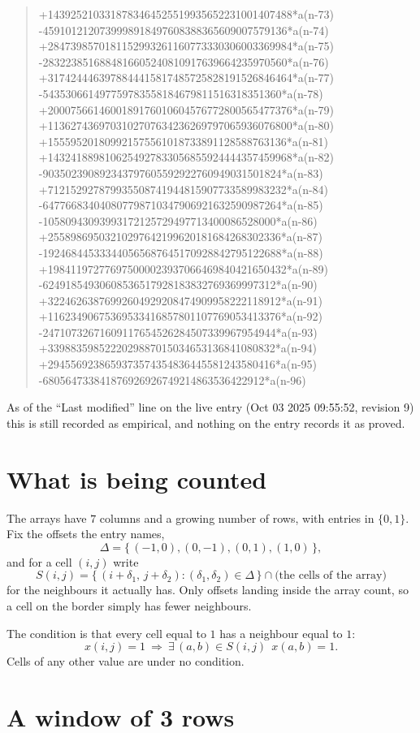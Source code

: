 \documentclass[11pt,a4paper]{article}
\theoremstyle{plain}
\theoremstyle{definition}
\begin{document}
\begin{quote}
+1439252103318783464525519935652231001407488*a(n-73) -4591012120739998918497608388365609007579136*a(n-74) +2847398570181152993261160773330306003369984*a(n-75) -2832238516884816605240810917639664235970560*a(n-76) +3174244463978844415817485725828191526846464*a(n-77) -543530661497759783558184679811516318351360*a(n-78) +2000756614600189176010604576772800565477376*a(n-79) +1136274369703102707634236269797065936076800*a(n-80) +155595201809921575561018733891128588763136*a(n-81) +1432418898106254927833056855924444357459968*a(n-82) -903502390892343797605592922760949031501824*a(n-83) +712152927879935508741944815907733589983232*a(n-84) -647766834040807798710347906921632590987264*a(n-85) -10580943093993172125729497713400086528000*a(n-86) +25589869503210297642199620181684268302336*a(n-87) -192468445333440565687645170928842795122688*a(n-88) +198411972776975000023937066469840421650432*a(n-89) -62491854930608536517928183832769369997312*a(n-90) +32246263876992604929208474909958222118912*a(n-91) +11623490675369533416857801107769053413376*a(n-92) -24710732671609117654526284507339967954944*a(n-93) +3398835985222029887015034653136841080832*a(n-94) +2945569238659373574354836445581243580416*a(n-95) -680564733841876926926749214863536422912*a(n-96)
\end{quote}
As of the ``Last modified'' line on the live entry (Oct 03 2025 09:55:52, revision 9) this is still
recorded as empirical, and nothing on the entry records it as proved.

\section{What is being counted}

The arrays have $7$ columns and a growing number of rows, with entries in $\{0,1\}$. Fix the
offsets the entry names,
\[
\Delta=\{\,(-1,0), (0,-1), (0,1), (1,0)\,\},
\]
and for a cell $(i,j)$ write
\[
S(i,j)=\{\,(i+\delta_1,\,j+\delta_2) : (\delta_1,\delta_2)\in\Delta\,\}\cap
\text{(the cells of the array)}
\]
for the neighbours it actually has. Only offsets landing inside the array count, so a cell on
the border simply has fewer neighbours.

The condition is that every cell equal to $1$ has a neighbour equal to $1$:
\[
x(i,j)=1\ \Longrightarrow\ \exists\,(a,b)\in S(i,j)\ \ x(a,b)=1 .
\]
Cells of any other value are under no condition.

\section{A window of 3 rows}
\end{document}
